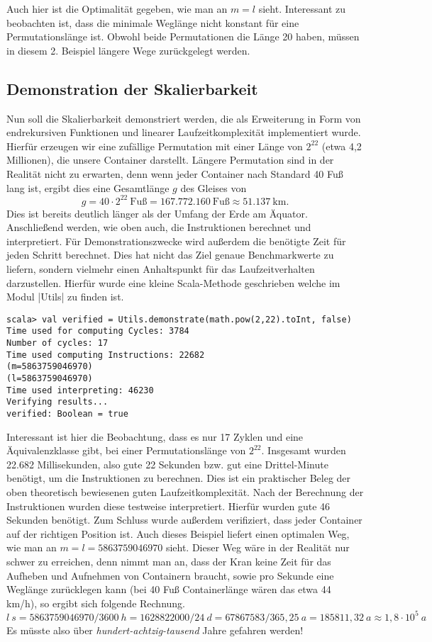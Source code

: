 Auch hier ist die Optimalität gegeben, wie man an $m = l$ sieht.
Interessant zu beobachten ist, dass die minimale Weglänge nicht konstant für eine Permutationslänge ist.
Obwohl beide Permutationen die Länge 20 haben, müssen in diesem 2. Beispiel längere Wege zurückgelegt werden.
\clearpage
\subsection{Demonstration der Skalierbarkeit}
\label{scalability}
Nun soll die Skalierbarkeit demonstriert werden,
die als Erweiterung in Form von endrekursiven Funktionen und linearer Laufzeitkomplexität implementiert wurde.\\
Hierfür erzeugen wir eine zufällige Permutation mit einer Länge von $2^{22}$ (etwa 4,2 Millionen), die unsere Container darstellt.
Längere Permutation sind in der Realität nicht zu erwarten, denn wenn jeder Container nach Standard 40 Fuß lang ist, ergibt dies eine Gesamtlänge $g$ des Gleises von
 \[ g = 40 \cdot 2^{22}\ \text{Fuß} = 167.772.160\ \text{Fuß} \approx 51.137\ \text{km}. \]
Dies ist bereits deutlich länger als der Umfang der Erde am Äquator.
Anschließend werden, wie oben auch, die Instruktionen berechnet und interpretiert.
Für Demonstrationszwecke wird außerdem die benötigte Zeit für jeden Schritt berechnet.
Dies hat nicht das Ziel genaue Benchmarkwerte zu liefern, sondern vielmehr einen Anhaltspunkt für das Laufzeitverhalten darzustellen.
Hierfür wurde eine kleine Scala-Methode geschrieben welche im Modul |Utils| zu finden ist.
\begin{lstlisting}
scala> val verified = Utils.demonstrate(math.pow(2,22).toInt, false)
Time used for computing Cycles: 3784
Number of cycles: 17
Time used computing Instructions: 22682
(m=5863759046970)
(l=5863759046970)
Time used interpreting: 46230
Verifying results...
verified: Boolean = true
\end{lstlisting}
\lstset{basicstyle=\ttfamily}
Interessant ist hier die Beobachtung, dass es nur 17 Zyklen und eine Äquivalenzklasse gibt, bei einer Permutationslänge von $2^{22}$.
Insgesamt wurden 22.682 Millisekunden, also gute 22 Sekunden bzw. gut eine Drittel-Minute benötigt, um die Instruktionen zu berechnen.
Dies ist ein praktischer Beleg der oben theoretisch bewiesenen guten Laufzeitkomplexität.
Nach der Berechnung der Instruktionen wurden diese testweise interpretiert. Hierfür wurden gute 46 Sekunden benötigt.
Zum Schluss wurde außerdem verifiziert, dass jeder Container auf der richtigen Position ist.
Auch dieses Beispiel liefert einen optimalen Weg, wie man an $m = l = 5863759046970$ sieht.
Dieser Weg wäre in der Realität nur schwer zu erreichen, denn nimmt man an, dass der Kran keine Zeit für das Aufheben und Aufnehmen von Containern braucht,
 sowie pro Sekunde eine Weglänge zurücklegen kann (bei 40 Fuß Containerlänge wären das etwa 44 km/h), so ergibt sich folgende Rechnung.
\[l\ s = 5863759046970 / 3600\ h = 1628822000 / 24\ d = 67867583 / 365,25\ a = 185811,32\ a \approx 1,8 \cdot 10^{5}\ a \]
Es müsste also über \emph{hundert-achtzig-tausend} Jahre gefahren werden!
\clearpage

